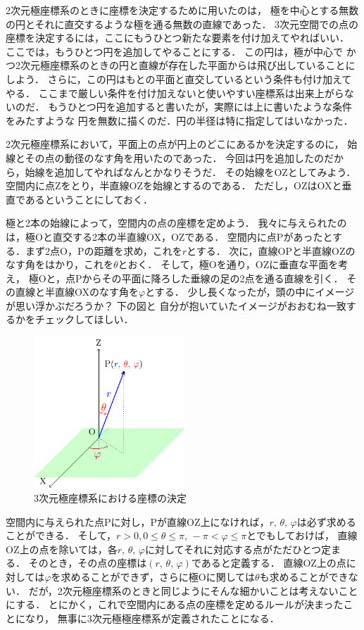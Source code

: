 2次元極座標系のときに座標を決定するために用いたのは，
極を中心とする無数の円とそれに直交するような極を通る無数の直線であった．
3次元空間での点の座標を決定するには，ここにもうひとつ新たな要素を付け加えてやればいい．
ここでは，もうひとつ円を追加してやることにする．
この円は，極が中心で
かつ2次元極座標系のときの円と直線が存在した平面からは飛び出していることにしよう．
さらに，この円はもとの平面と直交しているという条件も付け加えてやる．
ここまで厳しい条件を付け加えないと使いやすい座標系は出来上がらないのだ．
もうひとつ円を追加すると書いたが，実際には上に書いたような条件をみたすような
円を無数に描くのだ．円の半径は特に指定してはいなかった．

2次元極座標系において，平面上の点が円上のどこにあるかを決定するのに，
始線とその点の動径のなす角を用いたのであった．
今回は円を追加したのだから，始線を追加してやればなんとかなりそうだ．
その始線をOZとしてみよう．空間内に点Zをとり，半直線OZを始線とするのである．
ただし，OZはOXと垂直であるということにしておく．

極と2本の始線によって，空間内の点の座標を定めよう．
我々に与えられたのは，極Oと直交する2本の半直線OX，OZである．
空間内に点Pがあったとする．まず2点O，Pの距離を求め，これを$r$とする．
次に，直線OPと半直線OZのなす角をはかり，これを$\theta$とおく．
そして，極Oを通り，OZに垂直な平面を考え，
極Oと，点Pからその平面に降ろした垂線の足の2点を通る直線を引く．
その直線と半直線OXのなす角を$\varphi$とする．
少し長くなったが，頭の中にイメージが思い浮かぶだろうか？ 下の図と
自分が抱いていたイメージがおおむね一致するかをチェックしてほしい．
\begin{figure}[h]
 \begin{center}
 \includegraphics[width=5.7cm]{picture/vecter22.pdf}
 \caption{3次元極座標系における座標の決定}
\label{fig:3dkyokuzahyou}
 \end{center}
\end{figure}

空間内に与えられた点Pに対し，Pが直線OZ上になければ，$ r, \, \theta, \, \varphi $は必ず求めることができる．
そして，$r>0, 0 \leq \theta \leq \pi , \, - \pi < \varphi \leq \pi$とでもしておけば，
直線OZ上の点を除いては，各$r, \, \theta, \, \varphi$に対してそれに対応する点がただひとつ定まる．
そのとき，その点の座標は$(r, \, \theta, \, \varphi)$であると定義する．
直線OZ上の点に対しては$\varphi$を求めることができず，さらに極Oに関しては$\theta$も求めることができない．
だが，2次元極座標系のときと同じようにそんな細かいことは考えないことにする．
とにかく，これで空間内にある点の座標を定めるルールが決まったことになり，
無事に3次元極極座標系が定義されたことになる．


